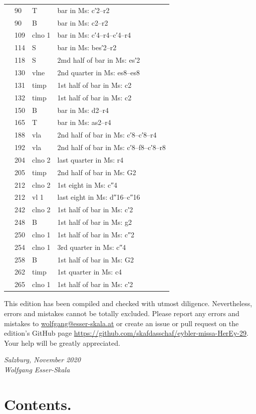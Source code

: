 \documentclass[parskip=full]{scrreprt}
\newif\iftemplate\templatetrue
\begin{document}
\begin{longtable}{lll L{10cm}}
	  & 90  & T       & bar in Ms: c′2–r2 \\
	  & 90  & B       & bar in Ms: c2–r2 \\
	  & 109 & clno 1  & bar in Ms: c′4–r4–c′4–r4 \\
	  & 114 & S       & bar in Ms: bes′2–r2 \\
	  & 118 & S       & 2md half of bar in Ms: es′2 \\
	  & 130 & vlne    & 2nd quarter in Ms: es8–es8 \\
	  & 131 & timp    & 1st half of bar in Ms: c2 \\
	  & 132 & timp    & 1st half of bar in Ms: c2 \\
	  & 150 & B       & bar in Ms: d2–r4 \\
	  & 165 & T       & bar in Ms: as2–r4 \\
	  & 188 & vla     & 2nd half of bar in Ms: c′8–c′8–r4 \\
	  & 192 & vla     & 2nd half of bar in Ms: c′8–f8–c′8–r8 \\
	  & 204 & clno 2  & last quarter in Ms: r4 \\
	  & 205 & timp    & 2nd half of bar in Ms: G2 \\
	  & 212 & clno 2  & 1st eight in Ms: c″4 \\
	  & 212 & vl 1    & last eight in Ms: d″16–c″16 \\
	  & 242 & clno 2  & 1st half of bar in Ms: c′2 \\
	  & 248 & B       & 1st half of bar in Ms: g2 \\
	  & 250 & clno 1  & 1st half of bar in Ms: c″2 \\
	  & 254 & clno 1  & 3rd quarter in Ms: c″4 \\
	  & 258 & B       & 1st half of bar in Ms: G2 \\
	  & 262 & timp    & 1st quarter in Ms: c4 \\
	  & 265 & clno 1  & 1st half of bar in Ms: c′2 \\
	\bottomrule
\end{longtable}


This edition has been compiled and checked with utmost diligence. Nevertheless, errors and mistakes cannot be totally excluded. Please report any errors and mistakes to \url{wolfgang@esser-skala.at} or create an issue or pull request on the edition’s GitHub page \url{https://github.com/skafdasschaf/eybler-missa-HerEy-29}. Your help will be greatly appreciated.

\bigskip
\textit{Salzburg, November 2020\\
Wolfgang Esser-Skala}

\cleardoublepage
\chapter*{Contents.}


\cleardoublepage
\fi

\iftemplate

\fi
\end{document}

